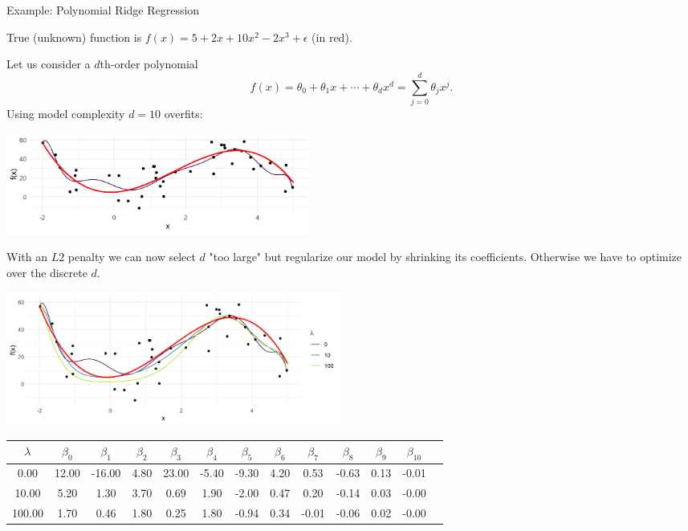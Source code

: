 \begin{vbframe}{Example: Polynomial Ridge Regression}

True (unknown) function is \(f(x) = 5 + 2x +10x^2 - 2x^3 + \epsilon\) (in red).

\lz

Let us consider a \(d\)th-order polynomial
\[ f(x) = \theta_0 + \theta_1 x + \cdots + \theta_d x^d = \sum_{j = 0}^{d} \theta_j x^j\text{.} \]
Using model complexity $d = 10$ overfits:

\begin{center}
\includegraphics[width = 10cm ]{figure/poly_ridge_1.png} \\
\end{center}

\framebreak

With an $L2$ penalty we can now select $d$ "too large" but regularize our model by shrinking its coefficients. Otherwise we have to optimize over the discrete $d$.

\vfill

\begin{center}
\includegraphics[width = 11cm ]{figure/poly_ridge_2.png} \\
\end{center}


\begin{center}
\tiny
\begin{tabular}{ c| c c c c c c c c c c c c}
 $\lambda$ & $\beta_0$ & $\beta_1$ & $\beta_2$ & $\beta_3$ & $\beta_4$ & $\beta_5$ & $\beta_6$ & $\beta_7$ & $\beta_8$ & $\beta_9$ & $\beta_{10}$ \\ 
 \hline
 0.00 & 12.00 & -16.00 & 4.80 & 23.00 & -5.40 & -9.30 & 4.20 & 0.53 & -0.63 & 0.13 & -0.01 \\  
 10.00 & 5.20 &1.30 & 3.70 & 0.69 & 1.90 & -2.00 & 0.47 & 0.20 & -0.14 & 0.03 & -0.00 \\ 
 100.00 & 1.70 & 0.46 & 1.80 & 0.25 & 1.80 & -0.94 & 0.34 & -0.01 & -0.06 & 0.02 & -0.00
\end{tabular}
\end{center}


\end{vbframe}

